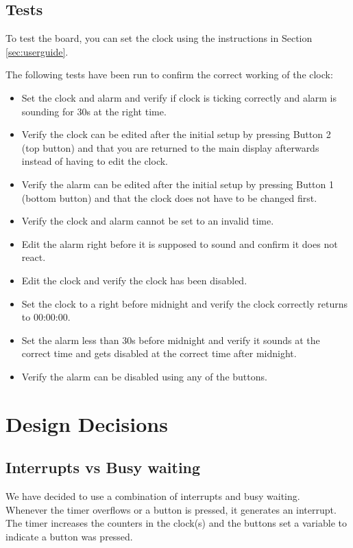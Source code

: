 \documentclass[11pt,a4paper]{scrartcl}
\begin{document}
\subsection{Tests}
To test the board, you can set the clock using the instructions in Section \ref{sec:userguide}.

The following tests have been run to confirm the correct working of the clock:
\begin{itemize}
\item Set the clock and alarm and verify if clock is ticking correctly and alarm is sounding for 30s at the right time.
\item Verify the clock can be edited after the initial setup by pressing Button 2 (top button) and that you are returned to the main display afterwards instead of having to edit the clock.
\item Verify the alarm can be edited after the initial setup by pressing Button 1 (bottom button) and that the clock does not have to be changed first. 
\item Verify the clock and alarm cannot be set to an invalid time.
\item Edit the alarm right before it is supposed to sound and confirm it does not react.
\item Edit the clock and verify the clock has been disabled.
\item Set the clock to a right before midnight and verify the clock correctly returns to 00:00:00.
\item Set the alarm less than 30s before midnight and verify it sounds at the correct time and gets disabled at the correct time after midnight.
\item Verify the alarm can be disabled using any of the buttons.
\end{itemize}

\section{Design Decisions}

\subsection{Interrupts vs Busy waiting}
We have decided to use a combination of interrupts and busy waiting.\\
Whenever the timer overflows or a button is pressed, it generates an interrupt. The timer increases the counters in the clock(s) and the buttons set a variable to indicate a button was pressed.
\end{document}
